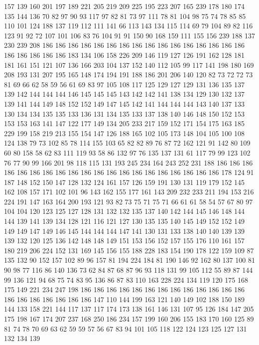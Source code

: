 157 139 160 201 197 189 221 205 219 209 225 195 223 207 165 239 178 180 174 135
144 136 70 82 97 90 93 117 97 82 81 73 97 111 78 81 104 98 75 74
78 85 85 110 101 124 188 137 119 112 111 141 66 113 143 134 115 114 69 79
104 89 82 116 123 91 92 72 107 101 106 83 76 104 91 91 150 90 168 159
111 155 156 239 188 137 230 239 208 186 186 186 186 186 186 186 186 186 186 186
186 186 186 186 186 186 186 186 186 186 183 134 106 158 226 209 146 119 127 126
191 162 128 181 181 161 151 121 107 136 166 203 104 137 152 140 112 105 99 117
141 198 180 169 208 193 131 207 195 165 148 174 194 191 188 186 201 206 140 120
82 73 72 72 73 81 69 66 62 58 59 56 61 69 83 97 105 108 117 125
129 127 129 131 136 135 137 139 142 144 144 144 146 145 145 145 143 142 142 141
138 134 129 130 132 137 139 141 144 149 148 152 152 149 147 145 142 141 144 144
144 143 140 137 133 130 134 134 135 135 133 136 131 134 135 133 137 138 140 146
148 150 152 153 153 153 163 141 147 122 177 149 134 205 233 217 159 152 171 154
175 163 185 229 199 158 219 213 155 154 147 126 188 165 102 105 173 148 104 105
100 108 124 138 79 73 102 85 78 114 155 103 65 82 82 89 76 87 72 162
121 91 142 80 109 60 80 158 58 62 83 111 119 93 58 86 132 97 76 135
137 131 61 117 79 99 123 102 76 77 90 99 166 201 98 118 115 131 193 245
234 164 243 252 231 188 186 186 186 186 186 186 186 186 186 186 186 186 186 186
186 186 186 186 186 186 178 124 91 187 148 152 150 147 128 132 124 161 157 126
159 191 130 131 119 179 152 145 162 108 157 171 102 101 96 143 162 155 177 161
143 209 232 233 211 194 153 216 224 191 147 163 164 200 193 121 93 82 73 75
71 75 71 66 61 61 58 54 57 67 80 97 104 104 120 123 125 127 128 131
132 132 135 137 140 142 144 145 146 148 144 144 139 141 139 134 128 121 116 121
127 130 135 135 140 145 149 152 152 149 149 149 147 149 146 145 144 144 144 147
141 130 131 133 138 140 140 139 139 139 132 120 125 136 142 148 148 149 151 153
156 152 157 155 176 110 161 157 180 219 206 224 152 131 169 145 156 155 188 228
183 154 190 178 122 159 109 87 135 132 90 152 157 102 89 96 157 81 194 224
184 81 190 146 92 162 80 137 100 81 90 98 77 116 86 140 136 73 62 84
87 68 87 96 93 118 131 99 105 112 55 89 87 144 99 136 121 94 68 75
74 83 95 136 86 87 83 110 163 228 224 134 119 120 175 168 175 149 221 234
247 198 186 186 186 186 186 186 186 186 186 186 186 186 186 186 186 186 186 186
186 186 147 110 144 199 163 121 140 149 102 188 150 189 144 133 158 221 144 117
137 117 174 173 138 161 146 131 107 95 126 184 147 205 175 198 167 174 207 237
168 250 186 234 157 199 160 206 155 183 170 160 125 89 81 74 78 70 69 63
62 59 59 57 56 67 83 94 101 105 118 122 124 123 125 127 131 132 134 139

